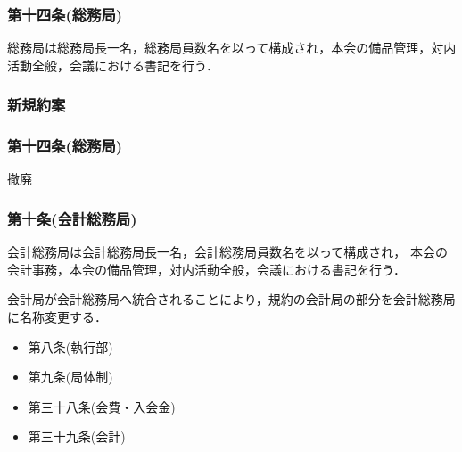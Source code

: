 \subsubsection*{第十四条(総務局)}
総務局は総務局長一名，総務局員数名を以って構成され，本会の備品管理，対内活動全般，会議における書記を行う．

\subsubsection*{新規約案}
\subsubsection*{第十四条(総務局)}
撤廃

\subsubsection*{第十条(会計総務局)}
会計総務局は会計総務局長一名，会計総務局員数名を以って構成され，
本会の会計事務，本会の備品管理，対内活動全般，会議における書記を行う．

会計局が会計総務局へ統合されることにより，規約の会計局の部分を会計総務局に名称変更する．
\begin{itemize}
  \item 第八条(執行部)
  \item 第九条(局体制)
  \item 第三十八条(会費・入会金)
  \item 第三十九条(会計)
\end{itemize}



